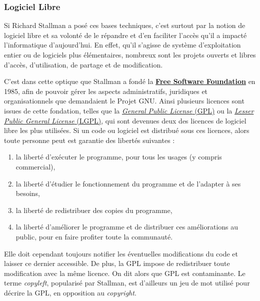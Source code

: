 \subsubsection{Logiciel Libre}
Si Richard Stallman a posé ces bases techniques, c'est surtout par la notion de logiciel libre et sa volonté de le répandre et d'en faciliter l'accès qu'il a impacté l'informatique d'aujourd'hui. En effet, qu'il s'agisse de système d'exploitation entier ou de logiciels plus élémentaires, nombreux sont les projets ouverts et libres d'accès, d'utilisation, de partage et de modification.

C'est dans cette optique que Stallman a fondé la \href{https://www.fsf.org}{\textbf{Free Software Foundation}} en 1985, afin de pouvoir gérer les aspects administratifs, juridiques et organisationnels que demandaient le Projet GNU. Ainsi plusieurs licences sont issues de cette fondation, telles que la \href{https://www.gnu.org/licenses/quick-guide-gplv3.html}{\textit{General Public License} (GPL)} ou la \href{https://www.gnu.org/licenses/lgpl-3.0.en.html}{\textit{Lesser Public General License} (LGPL)}, qui sont devenues deux des licences de logiciel libre les plus utilisées. Si un code ou logiciel est distribué sous ces licences, alors toute personne peut est garantie des libertés suivantes : 
\begin{enumerate}
    \item la liberté d’exécuter le programme, pour tous les usages (y compris commercial),
    \item la liberté d’étudier le fonctionnement du programme et de l’adapter à ses besoins,
    \item la liberté de redistribuer des copies du programme,
    \item la liberté d’améliorer le programme et de distribuer ces améliorations au public, pour en faire profiter toute la communauté.
\end{enumerate}
Elle doit cependant toujours notifier les éventuelles modifications du code et laisser ce dernier accessible. De plus, la GPL impose de redistribuer toute modification avec la même licence. On dit alors que GPL est contaminante. Le terme \textit{copyleft}, popularisé par Stallman, est d'ailleurs un jeu de mot utilisé pour décrire la GPL, en opposition au \textit{copyright}.

